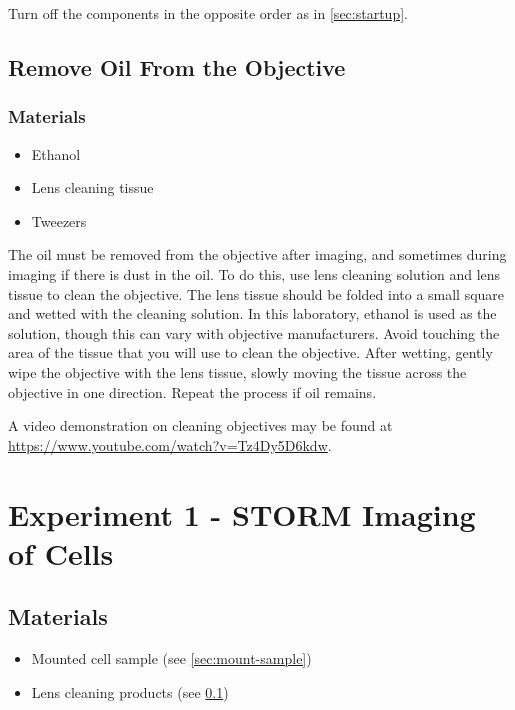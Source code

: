 \documentclass[10pt,a4paper,oneside]{book}
\begin{document}
Turn off the components in the opposite order as in \autoref{sec:startup}.

\subsection{Remove Oil From the Objective}\label{sec:remove-oil}

\subsubsection{Materials}

\begin{itemize}
    \item{Ethanol}
    \item{Lens cleaning tissue}
    \item{Tweezers}
\end{itemize}

The oil must be removed from the objective after imaging, and sometimes during imaging if there is dust in the oil. To do this, use lens cleaning solution and lens tissue to clean the objective. The lens tissue should be folded into a small square and wetted with the cleaning solution. In this laboratory, ethanol is used as the solution, though this can vary with objective manufacturers. Avoid touching the area of the tissue that you will use to clean the objective. After wetting, gently wipe the objective with the lens tissue, slowly moving the tissue across the objective in one direction. Repeat the process if oil remains.

A video demonstration on cleaning objectives may be found at \url{https://www.youtube.com/watch?v=Tz4Dy5D6kdw}.

\section{Experiment 1 - STORM Imaging of Cells}

\subsection{Materials}

\begin{itemize}
    \item{Mounted cell sample (see \ref{sec:mount-sample})}
    \item{Lens cleaning products (see \ref{sec:remove-oil})}
\end{itemize}
\end{document}

